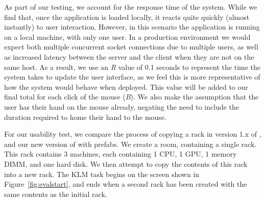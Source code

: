\documentclass[11pt]{article}
\begin{document}
			As part of our testing, we account for the response time of the system. 
			While we find that, once the application is loaded locally, it reacts quite quickly (almost instantly) to user interaction.
			However, in this scenario the application is running on a local machine, with only one user.
			In a production environment we would expect both multiple concurrent socket connections due to multiple users, as well as increased latency between the server and the client when they are not on the same host. 
			As a result, we use an \textit{R} value of 0.1 seconds to represent the time the system takes to update the user interface, as we feel this is more representative of how the system would behave when deployed.
			This value will be added to our final total for each click of the mouse (\textit{B}).
			We also make the assumption that the user has their hand on the mouse already, negating the need to include the duration required to home their hand to the mouse.

			For our usability test, we compare the process of copying a rack in version 1.x of \opendc{}, and our new version of \opendc{} with prefabs.
			We create a room, containing a single rack.
			This rack contains 3 machines, each containing 1 CPU, 1 GPU, 1 memory DIMM, and one hard disk.
			We then attempt to copy the contents of this rack into a new rack.
			The KLM task begins on the screen shown in Figure~\ref{fig:evalstart}, and ends when a second rack has been created with the same contents as the initial rack.
			
\end{document}

